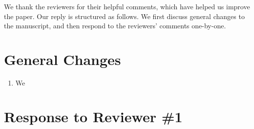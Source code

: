 \documentclass{article}
\begin{document}
We thank the reviewers for their helpful comments, which have helped us improve the paper. Our reply is structured as follows. We first discuss general changes to the manuscript, and then respond to the reviewers’ comments one-by-one. 

\section{General Changes}

\begin{enumerate}
    \item We
\end{enumerate}

\section{Response to Reviewer \#1}


\end{document}
